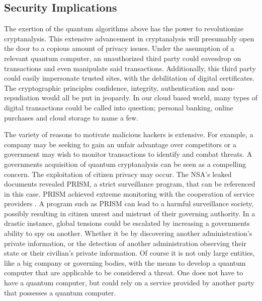 \subsection{Security Implications}
The exertion of the quantum algorithms above has the power to revolutionize cryptanalysis. This extensive advancement in cryptanalysis will presumably open the door to a copious amount of privacy issues. Under the assumption of a relevant quantum computer, an unauthorized third party could eavesdrop on transactions and even manipulate said transactions. Additionally, this third party could easily impersonate trusted sites, with the debilitation of digital certificates. The cryptographic principles confidence, integrity, authentication and non-repudiation would all be put in jeopardy. In our cloud based world, many types of digital transactions could be called into question; personal banking, online purchases and cloud storage to name a few.

The variety of reasons to motivate malicious hackers is extensive. For example, a company may be seeking to gain an unfair advantage over competitors or a government may wish to monitor transactions to identify and combat threats. A governments acquisition of quantum cryptanalysis can be seen as a compelling concern. The exploitation of citizen privacy may occur. The NSA's leaked documents revealed PRISM, a strict surveillance program, that can be referenced in this case. PRISM achieved extreme monitoring with the cooperation of service providers \cite{Sec_Risk}. A program such as PRISM can lead to a harmful surveillance society, possibly resulting in citizen unrest and mistrust of their governing authority. In a drastic instance, global tensions could be escalated by increasing a governments ability to spy on another. Whether it be by discovering another administration's private information, or the detection of another administration observing their state or their civilian's private information. 
Of course it is not only large entities, like a big company or governing bodies, with the means to develop a quantum computer that are applicable to be considered a threat. One does not have to have a quantum computer, but could rely on a service provided by another party that possesses a quantum computer. 